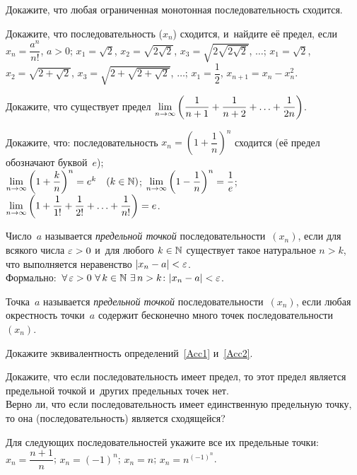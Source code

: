 \documentclass[a4paper,12pt]{article}
\begin{document}

Докажите, что любая ограниченная монотонная последовательность сходится.


Докажите, что последовательность ($x_{n}$) сходится, и~найдите её предел, если
$x_n = \dfrac{a^n}{n!}$, $a>0$;
$x_1=\sqrt{2}$, $x_2=\sqrt{2\sqrt{2}}$, $x_3=\sqrt{2\sqrt{2\sqrt{2}}}$,  $\ldots$;
$x_1=\sqrt{2}$, $x_2=\sqrt{2+\sqrt{2}}$, $x_3=\sqrt{2+\sqrt{2+\sqrt{2}}}$, $\ldots$;
$x_1=\dfrac{1}{2}$, $x_{n+1}=x_{n}-x^2_{n}$.

Докажите, что существует предел $\lim\limits_{n \rightarrow \infty} \left(\dfrac{1}{n+1} + \dfrac{1}{n+2} + \ldots + \dfrac{1}{2n}\right)$.

Докажите, что:
последовательность $x_n=\left(1+\dfrac1n\right)^n$ сходится (её предел обозначают буквой~$e$);\\
$\lim\limits_{n \rightarrow \infty}\left(1+\dfrac kn\right)^n=e^k \quad (k\in\mathbb{N})$;
$\lim\limits_{n \rightarrow \infty}\left(1-\dfrac1n\right)^n = \dfrac1e$;
$\lim\limits_{n \rightarrow \infty}\left(1+\dfrac1{1!}+\dfrac1{2!}+\ldots+\dfrac1{n!}\right)=e$.

\label{Acc1}
Число~$a$ называется \emph{предельной точкой} последовательности~$(x_n)$, если для всякого числа $\varepsilon>0$ и~для любого $k\in\mathbb{N}$ существует такое натуральное $n>k$, что выполняется неравенство $|x_n-a|<\varepsilon$.\\
Формально: $\,\forall\, \varepsilon>0\, \,\forall\, k\in\mathbb{N}\, \,\exists\, n>k \colon |x_n-a|<\varepsilon$.

\label{Acc2}
Точка~$a$ называется {\it предельной точкой} последовательности~$(x_n)$, если любая окрестность точки~$a$ содержит бесконечно много точек последовательности~$(x_n)$.

Докажите эквивалентность определений~\ref{Acc1} и~\ref{Acc2}.

Докажите, что если последовательность имеет предел, то этот предел является предельной точкой и~других предельных точек нет.\\
Верно ли, что если последовательность имеет единственную предельную точку, то она (последовательность) является сходящейся?

Для следующих последовательностей укажите все их предельные точки:\\
$x_{n}=\dfrac{n+1}{n}$;
$x_{n}=(-1)^{n}$;
$x_{n}=n$;
$x_{n}=n^{(-1)^n}$.


\vfill
{}
\newpage
\end{document}
